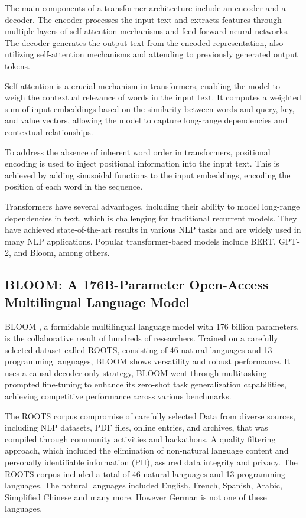 The main components of a transformer architecture include an encoder and a decoder. The encoder processes the input text and extracts features through multiple layers of self-attention mechanisms and feed-forward neural networks. The decoder generates the output text from the encoded representation, also utilizing self-attention mechanisms and attending to previously generated output tokens.

Self-attention is a crucial mechanism in transformers, enabling the model to weigh the contextual relevance of words in the input text. It computes a weighted sum of input embeddings based on the similarity between words and query, key, and value vectors, allowing the model to capture long-range dependencies and contextual relationships.

To address the absence of inherent word order in transformers, positional encoding is used to inject positional information into the input text. This is achieved by adding sinusoidal functions to the input embeddings, encoding the position of each word in the sequence.

Transformers have several advantages, including their ability to model long-range dependencies in text, which is challenging for traditional recurrent models. They have achieved state-of-the-art results in various NLP tasks and are widely used in many NLP applications. Popular transformer-based models include BERT, GPT-2, and Bloom, among others.\cite{tunstall2022natural} \cite{lin2021survey}



\subsection{BLOOM: A 176B-Parameter Open-Access Multilingual Language Model}

BLOOM \cite{workshop2023bloom}, a formidable multilingual language model with 176 billion parameters, is the collaborative result of hundreds of researchers. Trained on a carefully selected dataset called ROOTS, consisting of 46 natural languages and 13 programming languages, BLOOM shows versatility and robust performance. It uses a causal decoder-only strategy, BLOOM went through multitasking prompted fine-tuning to enhance its zero-shot task generalization capabilities, achieving competitive performance across various benchmarks.

The ROOTS corpus compromise of carefully selected Data from diverse sources, including NLP datasets, PDF files, online entries, and archives, that was compiled through community activities and hackathons. A quality filtering approach, which included the elimination of non-natural language content and personally identifiable information (PII), assured data integrity and privacy. The ROOTS corpus included a total of 46 natural languages and 13 programming languages. The natural languages included English, French, Spanish, Arabic, Simplified Chinese and many more. However German is not one of these languages.

